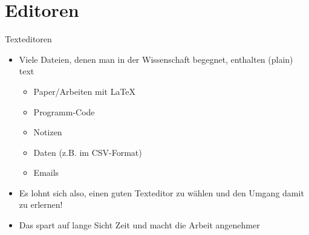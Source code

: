 \section{Editoren}




\begin{frame}{Texteditoren}
  \begin{itemize}
    \item Viele Dateien, denen man in der Wissenschaft begegnet, enthalten (plain) text
      \begin{itemize}
        \item Paper/Arbeiten mit \LaTeX
        \item Programm-Code
        \item Notizen
        \item Daten (z.B. im CSV-Format)
        \item Emails
      \end{itemize}
    \item Es lohnt sich also, einen guten Texteditor zu wählen und den Umgang damit zu erlernen!
    \item Das spart auf lange Sicht Zeit und macht die Arbeit angenehmer
  \end{itemize}
\end{frame}

